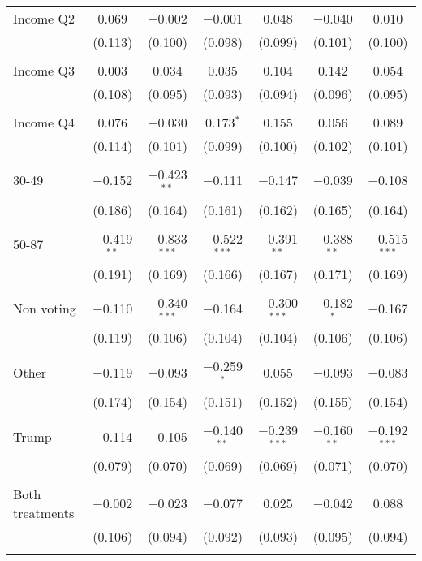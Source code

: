 \begin{tabular}{@{\extracolsep{5pt}}lcccccc}
 Income Q2 & 0.069 & $-$0.002 & $-$0.001 & 0.048 & $-$0.040 & 0.010 \\ 
  & (0.113) & (0.100) & (0.098) & (0.099) & (0.101) & (0.100) \\ 
  & & & & & & \\ 
 Income Q3 & 0.003 & 0.034 & 0.035 & 0.104 & 0.142 & 0.054 \\ 
  & (0.108) & (0.095) & (0.093) & (0.094) & (0.096) & (0.095) \\ 
  & & & & & & \\ 
 Income Q4 & 0.076 & $-$0.030 & 0.173$^{*}$ & 0.155 & 0.056 & 0.089 \\ 
  & (0.114) & (0.101) & (0.099) & (0.100) & (0.102) & (0.101) \\ 
  & & & & & & \\ 
 30-49 & $-$0.152 & $-$0.423$^{**}$ & $-$0.111 & $-$0.147 & $-$0.039 & $-$0.108 \\ 
  & (0.186) & (0.164) & (0.161) & (0.162) & (0.165) & (0.164) \\ 
  & & & & & & \\ 
 50-87 & $-$0.419$^{**}$ & $-$0.833$^{***}$ & $-$0.522$^{***}$ & $-$0.391$^{**}$ & $-$0.388$^{**}$ & $-$0.515$^{***}$ \\ 
  & (0.191) & (0.169) & (0.166) & (0.167) & (0.171) & (0.169) \\ 
  & & & & & & \\ 
 Non voting & $-$0.110 & $-$0.340$^{***}$ & $-$0.164 & $-$0.300$^{***}$ & $-$0.182$^{*}$ & $-$0.167 \\ 
  & (0.119) & (0.106) & (0.104) & (0.104) & (0.106) & (0.106) \\ 
  & & & & & & \\ 
 Other & $-$0.119 & $-$0.093 & $-$0.259$^{*}$ & 0.055 & $-$0.093 & $-$0.083 \\ 
  & (0.174) & (0.154) & (0.151) & (0.152) & (0.155) & (0.154) \\ 
  & & & & & & \\ 
 Trump & $-$0.114 & $-$0.105 & $-$0.140$^{**}$ & $-$0.239$^{***}$ & $-$0.160$^{**}$ & $-$0.192$^{***}$ \\ 
  & (0.079) & (0.070) & (0.069) & (0.069) & (0.071) & (0.070) \\ 
  & & & & & & \\ 
 Both treatments & $-$0.002 & $-$0.023 & $-$0.077 & 0.025 & $-$0.042 & 0.088 \\ 
  & (0.106) & (0.094) & (0.092) & (0.093) & (0.095) & (0.094) \\ 
  & & & & & & \\ 

\end{tabular}
